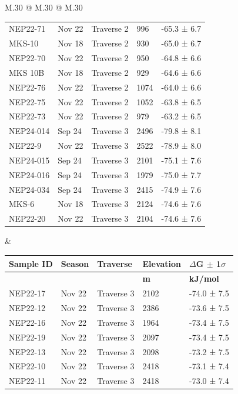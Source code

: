 \begin{landscape}
\begin{table}
\begin{tabular}{M{.30\textwidth} @{\hspace{4cm}} M{.30\textwidth} @{\hspace{4cm}} M{.30\textwidth}}
\begin{tabular}{l l l l l}
    NEP22-71 & Nov 22 & Traverse 2 & 996 & -65.3 ±  6.7 \\
    MKS-10 & Nov 18 & Traverse 2 & 930 & -65.0 ±  6.7 \\
    NEP22-70 & Nov 22 & Traverse 2 & 950 & -64.8 ±  6.6 \\
    MKS 10B & Nov 18 & Traverse 2 & 929 & -64.6 ±  6.6 \\
    NEP22-76 & Nov 22 & Traverse 2 & 1074 & -64.0 ±  6.6 \\
    NEP22-75 & Nov 22 & Traverse 2 & 1052 & -63.8 ±  6.5 \\
    NEP22-73 & Nov 22 & Traverse 2 & 979 & -63.2 ±  6.5 \\
    \specialrule{0.2pt}{1pt}{1pt}
    NEP24-014 & Sep 24 & Traverse 3 & 2496 & -79.8 ±  8.1 \\
    NEP22-9 & Nov 22 & Traverse 3 & 2522 & -78.9 ±  8.0 \\
    NEP24-015 & Sep 24 & Traverse 3 & 2101 & -75.1 ±  7.6 \\
    NEP24-016 & Sep 24 & Traverse 3 & 1979 & -75.0 ±  7.7 \\
    NEP24-034 & Sep 24 & Traverse 3 & 2415 & -74.9 ±  7.6 \\
    MKS-6 & Nov 18 & Traverse 3 & 2124 & -74.6 ±  7.6 \\
    NEP22-20 & Nov 22 & Traverse 3 & 2104 & -74.6 ±  7.6 \\
    \hline
        \end{tabular}
        &
        \begin{tabular}{l l l l l}
            \setlength\tabcolsep{0.1cm}
    \textbf{Sample ID}  &  \textbf{Season}  &  \textbf{Traverse}  &  \textbf{Elevation}  &  \textbf{$\Delta$G $\pm$ 1$\sigma$} \\
    \hline
    &   &   &  \textbf{m}  &  \textbf{kJ/mol} \\
    \hline
    NEP22-17 & Nov 22 & Traverse 3 & 2102 & -74.0 ±  7.5 \\
    NEP22-12 & Nov 22 & Traverse 3 & 2386 & -73.6 ±  7.5 \\
    NEP22-16 & Nov 22 & Traverse 3 & 1964 & -73.4 ±  7.5 \\
    NEP22-19 & Nov 22 & Traverse 3 & 2097 & -73.4 ±  7.5 \\
    NEP22-13 & Nov 22 & Traverse 3 & 2098 & -73.2 ±  7.5 \\
    NEP22-10 & Nov 22 & Traverse 3 & 2418 & -73.1 ±  7.4 \\
    NEP22-11 & Nov 22 & Traverse 3 & 2418 & -73.0 ±  7.4 \\

\end{tabular}
\end{tabular}
\end{table}
\end{landscape}
